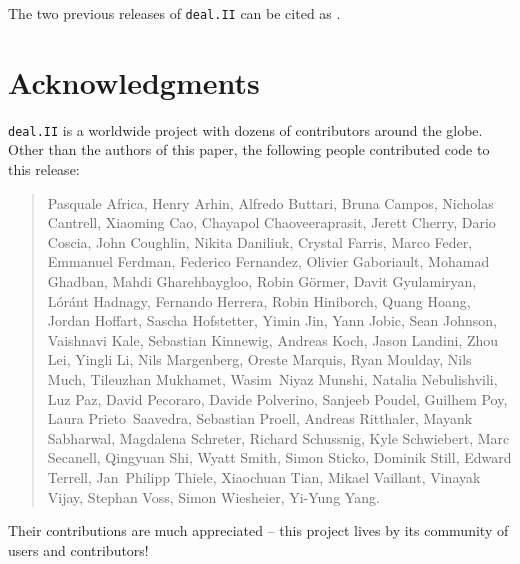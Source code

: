 \documentclass{ansarticle-preprint}
\newcommand{\specialword}[1]{\texttt{#1}}
\newcommand{\dealii}{{\specialword{deal.II}}\xspace}
\begin{document}
The two previous releases of \dealii can be cited as
\cite{dealII95,dealII96}.


\section{Acknowledgments}

\dealii is a worldwide project with dozens of contributors around the
globe. Other than the authors of this paper, the following people
contributed code to this release:\\

\begin{quote}
Pasquale     Africa,
Henry        Arhin,
Alfredo      Buttari,
Bruna        Campos,
Nicholas     Cantrell,
Xiaoming     Cao,
Chayapol     Chaoveeraprasit,
Jerett       Cherry,
Dario        Coscia,
John         Coughlin,
Nikita       Daniliuk,
Crystal      Farris,
Marco        Feder,
Emmanuel     Ferdman,
Federico     Fernandez,
Olivier      Gaboriault,
Mohamad      Ghadban,
Mahdi        Gharehbaygloo,
Robin        Görmer,
Davit        Gyulamiryan,
Lóránt       Hadnagy,
Fernando     Herrera,
Robin        Hiniborch,
Quang        Hoang,
Jordan       Hoffart,
Sascha       Hofstetter,
Yimin        Jin,
Yann         Jobic,
Sean         Johnson,
Vaishnavi    Kale,
Sebastian    Kinnewig,
Andreas      Koch,
Jason        Landini,
Zhou         Lei,
Yingli       Li,
Nils         Margenberg,
Oreste       Marquis,
Ryan         Moulday,
Nils         Much,
Tileuzhan    Mukhamet,
Wasim~Niyaz  Munshi,
Natalia      Nebulishvili,
Luz          Paz,
David        Pecoraro,
Davide       Polverino,
Sanjeeb      Poudel,
Guilhem      Poy,
Laura        Prieto~Saavedra,
Sebastian    Proell,
Andreas      Ritthaler,
Mayank       Sabharwal,
Magdalena    Schreter,
Richard      Schussnig,
Kyle         Schwiebert,
Marc         Secanell,
Qingyuan     Shi,
Wyatt        Smith,
Simon        Sticko,
Dominik      Still,
Edward       Terrell,
Jan~Philipp  Thiele,
Xiaochuan    Tian,
Mikael       Vaillant,
Vinayak      Vijay,
Stephan      Voss,
Simon        Wiesheier,
Yi-Yung      Yang.
\end{quote}
Their contributions are much appreciated -- this project lives by its
community of users and contributors!
\end{document}
